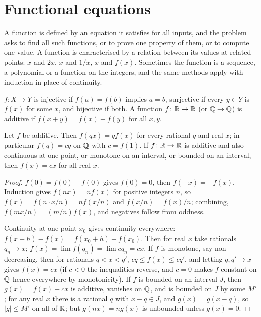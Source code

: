 \section{Functional equations}

\begin{recognise}
A function is defined by an equation it satisfies for all inputs, and the problem asks to find all such functions, or to prove one property of them, or to compute one value. A function is characterised by a relation between its values at related points: $x$ and $2x$, $x$ and $1/x$, $x$ and $f(x)$. Sometimes the function is a sequence, a polynomial or a function on the integers, and the same methods apply with induction in place of continuity.
\end{recognise}

\begin{definition}
$f\colon X\to Y$ is injective if $f(a)=f(b)$ implies $a=b$, surjective if every $y\in Y$ is $f(x)$ for some $x$, and bijective if both. A function $f\colon\mathbb{R}\to\mathbb{R}$ (or $\mathbb{Q}\to\mathbb{Q}$) is additive if $f(x+y)=f(x)+f(y)$ for all $x,y$.
\end{definition}

\begin{theorem}
Let $f$ be additive. Then $f(qx)=qf(x)$ for every rational $q$ and real $x$; in particular $f(q)=cq$ on $\mathbb{Q}$ with $c=f(1)$. If $f\colon\mathbb{R}\to\mathbb{R}$ is additive and also continuous at one point, or monotone on an interval, or bounded on an interval, then $f(x)=cx$ for all real $x$.
\end{theorem}

\begin{proof}
$f(0)=f(0)+f(0)$ gives $f(0)=0$, then $f(-x)=-f(x)$. Induction gives $f(nx)=nf(x)$ for positive integers $n$, so $f(x)=f(n\cdot x/n)=nf(x/n)$ and $f(x/n)=f(x)/n$; combining, $f(mx/n)=(m/n)f(x)$, and negatives follow from oddness.

Continuity at one point $x_0$ gives continuity everywhere: $f(x+h)-f(x)=f(x_0+h)-f(x_0)$. Then for real $x$ take rationals $q_n\to x$; $f(x)=\lim f(q_n)=\lim cq_n=cx$. If $f$ is monotone, say non-decreasing, then for rationals $q<x<q'$, $cq\le f(x)\le cq'$, and letting $q,q'\to x$ gives $f(x)=cx$ (if $c<0$ the inequalities reverse, and $c=0$ makes $f$ constant on $\mathbb{Q}$ hence everywhere by monotonicity). If $f$ is bounded on an interval $J$, then $g(x)=f(x)-cx$ is additive, vanishes on $\mathbb{Q}$, and is bounded on $J$ by some $M'$; for any real $x$ there is a rational $q$ with $x-q\in J$, and $g(x)=g(x-q)$, so $|g|\le M'$ on all of $\mathbb{R}$; but $g(nx)=ng(x)$ is unbounded unless $g(x)=0$.
\end{proof}

